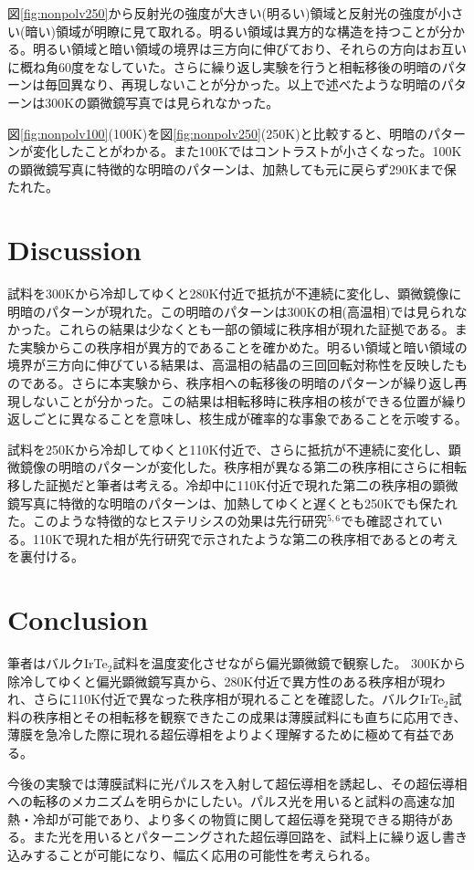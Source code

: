 \documentclass[11pt,a4paper]{article}
\begin{document}
図\ref{fig:nonpolv250}から反射光の強度が大きい(明るい)領域と反射光の強度が小さい(暗い)領域が明瞭に見て取れる。明るい領域は異方的な構造を持つことが分かる。明るい領域と暗い領域の境界は三方向に伸びており、それらの方向はお互いに概ね角60度をなしていた。さらに繰り返し実験を行うと相転移後の明暗のパターンは毎回異なり、再現しないことが分かった。以上で述べたような明暗のパターンは300Kの顕微鏡写真では見られなかった。

図\ref{fig:nonpolv100}(100K)を図\ref{fig:nonpolv250}(250K)と比較すると、明暗のパターンが変化したことがわかる。また100Kではコントラストが小さくなった。100Kの顕微鏡写真に特徴的な明暗のパターンは、加熱しても元に戻らず290Kまで保たれた。
 

\section{Discussion}
試料を300Kから冷却してゆくと280K付近で抵抗が不連続に変化し、顕微鏡像に明暗のパターンが現れた。この明暗のパターンは300Kの相(高温相)では見られなかった。これらの結果は少なくとも一部の領域に秩序相が現れた証拠である。また実験からこの秩序相が異方的であることを確かめた。明るい領域と暗い領域の境界が三方向に伸びている結果は、高温相の結晶の三回回転対称性を反映したものである。さらに本実験から、秩序相への転移後の明暗のパターンが繰り返し再現しないことが分かった。この結果は相転移時に秩序相の核ができる位置が繰り返しごとに異なることを意味し、核生成が確率的な事象であることを示唆する。

試料を250Kから冷却してゆくと110K付近で、さらに抵抗が不連続に変化し、顕微鏡像の明暗のパターンが変化した。秩序相が異なる第二の秩序相にさらに相転移した証拠だと筆者は考える。冷却中に110K付近で現れた第二の秩序相の顕微鏡写真に特徴的な明暗のパターンは、加熱してゆくと遅くとも250Kでも保たれた。このような特徴的なヒステリシスの効果は先行研究$^{5,6}$でも確認されている。110Kで現れた相が先行研究で示されたような第二の秩序相であるとの考えを裏付ける。
 
 \section{Conclusion}
筆者はバルクIrTe$_2$試料を温度変化させながら偏光顕微鏡で観察した。
300Kから除冷してゆくと偏光顕微鏡写真から、280K付近で異方性のある秩序相が現われ、さらに110K付近で異なった秩序相が現れることを確認した。バルクIrTe$_2$試料の秩序相とその相転移を観察できたこの成果は薄膜試料にも直ちに応用でき、薄膜を急冷した際に現れる超伝導相をよりよく理解するために極めて有益である。

今後の実験では薄膜試料に光パルスを入射して超伝導相を誘起し、その超伝導相への転移のメカニズムを明らかにしたい。パルス光を用いると試料の高速な加熱・冷却が可能であり、より多くの物質に関して超伝導を発現できる期待がある。また光を用いるとパターニングされた超伝導回路を、試料上に繰り返し書き込みすることが可能になり、幅広く応用の可能性を考えられる。
\end{document}
